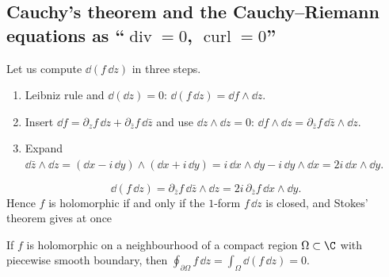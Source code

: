 \subsection{Cauchy's theorem and the Cauchy--Riemann equations as ``$\operatorname{div}=0$, $\operatorname{curl}=0$''}\label{sec:cauchy}

Let us compute $\dd(f\,\dd z)$ in three steps.
\begin{enumerate}
\item Leibniz rule and $\dd(\dd z)=0$: $\dd(f\,\dd z)=\dd f\wedge\dd z$.
\item Insert $\dd f=\partial_zf\,\dd z+\partial_{\bar z}f\,\dd\bar z$ and use $\dd z\wedge\dd z=0$: $\dd f\wedge\dd z=\partial_{\bar z}f\,\dd\bar z\wedge\dd z$.
\item Expand $\dd\bar z\wedge\dd z=(\dd x-i\,\dd y)\wedge(\dd x+i\,\dd y)=i\,\dd x\wedge\dd y-i\,\dd y\wedge\dd x=2i\,\dd x\wedge\dd y$.
\end{enumerate}
\begin{equation}\label{eq:dfdz}
\dd(f\,\dd z)=\partial_{\bar z}f\,\dd\bar z\wedge\dd z=2i\,\partial_{\bar z}f\,\dd x\wedge\dd y .
\end{equation}
Hence $f$ is holomorphic if and only if the $1$-form $f\,\dd z$ is closed, and Stokes' theorem gives at once

\begin{theorem}[Cauchy]\label{thm:cauchy}
If $f$ is holomorphic on a neighbourhood of a compact region $\Omega\subset\C$ with piecewise smooth boundary, then
$\displaystyle\oint_{\partial\Omega}f\,\dd z=\int_\Omega\dd(f\,\dd z)=0.$
\end{theorem}

